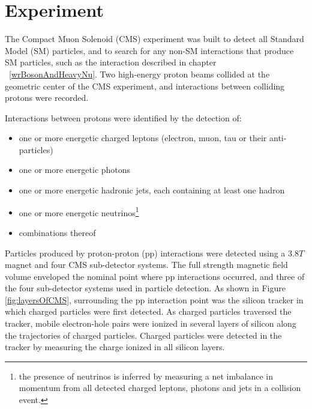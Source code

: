 \chapter{Experiment}
\label{experiment_chapter}
The Compact Muon Solenoid (CMS) experiment was built to detect all Standard Model (SM) particles, and to
search for any non-SM interactions that produce SM particles, such as the interaction described in 
chapter ~\ref{wrBosonAndHeavyNu}.  Two high-energy proton beams collided at the geometric center of
the CMS experiment, and interactions between colliding protons were recorded.

Interactions between protons were identified by the detection of:
\begin{itemize}
	\item one or more energetic charged leptons (electron, muon, tau or their anti-particles)
	\item one or more energetic photons
	\item one or more energetic hadronic jets, each containing at least one hadron
	\item one or more energetic neutrinos\footnote{the presence of neutrinos is inferred by measuring a net imbalance in 
		momentum from all detected charged leptons, photons and jets in a collision event.}
	\item combinations thereof
\end{itemize}
Particles produced by proton-proton (pp) interactions were detected using a 3.8$\unit{T}$ magnet and four CMS 
sub-detector systems.  The full strength magnetic field volume enveloped the nominal point where pp interactions occurred, and three of the four 
sub-detector systems used in particle detection.  As shown in Figure \ref{fig:layersOfCMS}, surrounding the pp interaction
point was the silicon tracker in which charged particles were first detected.  As charged particles traversed
the tracker, mobile electron-hole pairs were ionized in several layers of silicon along the trajectories of charged
particles.  Charged particles were detected in the tracker by measuring the charge ionized in all silicon layers.

